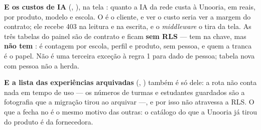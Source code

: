 \begin{regra}
\textbf{E os custos de IA} (, ),
na tela : quanto a IA da rede custa à Unooria, em
reais, por produto, modelo e escola. O  é o cliente, e
ver o custo seria ver a margem do contrato; ele recebe 403 na leitura e na
escrita, e o \emph{middleware} o tira da tela. As três tabelas do painel são de
contrato e ficam \textbf{sem RLS} ---  tem
 na chave, mas \textbf{não tem }: é contagem
por escola, perfil e produto, sem pessoa, e quem a tranca é o papel. Não é uma
terceira exceção à regra 1 para dado de pessoa; tabela nova com pessoa não a
herda.

\textbf{E a lista das experiências arquivadas} (,
) também é só dele: a rota não conta nada em tempo de uso --- os
números de turmas e estudantes guardados são a fotografia que a migração tirou ao
arquivar ---, e por isso não atravessa a RLS. O que a fecha no  é o
mesmo motivo das outras: o catálogo do que a Unooria já tirou do produto é da
fornecedora.
\end{regra}

